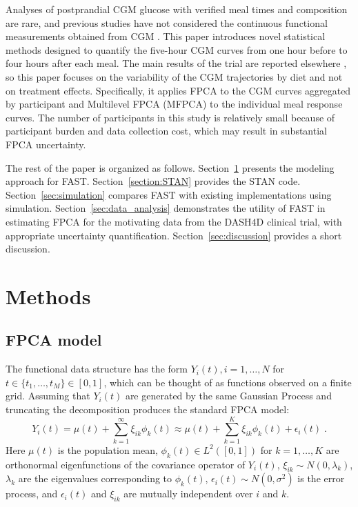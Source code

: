 \documentclass[12pt]{article}
\begin{document}
Analyses of postprandial CGM glucose with verified meal times and composition are rare, and previous studies have not considered the continuous functional measurements obtained from CGM \citep{barua_discordance_2022,rohling_determination_2019}. This paper introduces novel statistical methods designed to quantify the five-hour CGM curves from one hour before to four hours after each meal. The main results of the trial are reported elsewhere \citep{fang_dash4d_2025, pilla_dietary_2025}, so this paper focuses on the variability of the CGM trajectories by diet and not on treatment effects. Specifically, it applies FPCA to the CGM curves aggregated by participant and Multilevel FPCA (MFPCA) to the individual meal response curves. The number of participants in this study is relatively small because of participant burden and data collection cost, which may result in substantial FPCA uncertainty.

The rest of the paper is organized as follows. Section~\ref{sec:methods} presents the modeling approach for FAST. Section~\ref{section:STAN} provides the {\ttfamily STAN} code. Section~\ref{sec:simulation} compares FAST with existing implementations using simulation. Section~\ref{sec:data_analysis} demonstrates the utility of FAST in estimating FPCA for the motivating data from the DASH4D clinical trial, with appropriate uncertainty quantification. Section~\ref{sec:discussion} provides a short discussion.

\section{Methods}\label{sec:methods}

\subsection{FPCA model}\label{subsec:model}
The functional data structure has the form $Y_i(t), i=1,\ldots, N$ for $t \in \{t_1, \ldots, t_M\}\in [0,1]$, which can be thought of as functions observed on a finite grid. Assuming that $Y_i(t)$ are generated by the same Gaussian Process and truncating the decomposition  \citep{karhunen_uber_1947,kosambi_statistics_1943,  loeve_probability_1978} produces the standard FPCA model: 
\begin{equation}
Y_{i}(t) = \mu(t) + \sum_{k = 1}^\infty \xi_{ik}\phi_k(t) \approx \mu(t) + \sum_{k = 1}^K \xi_{ik}\phi_k(t) + \epsilon_i(t)\;. \label{EQ:Defn}
\end{equation}
Here $\mu(t)$ is the population mean, $\phi_k(t) \in L^2([0,1])$ for $k=1,\ldots,K$ are orthonormal eigenfunctions of the covariance operator of $Y_i(t)$, $\xi_{ik}\sim N(0, \lambda_k)$, $\lambda_k$ are the eigenvalues corresponding to $\phi_k(t)$, $\epsilon_i(t) \sim N(0, \sigma^2)$ is the error process, and $\epsilon_i(t)$ and $\xi_{ik}$ are mutually independent over $i$ and $k$.
\end{document}
